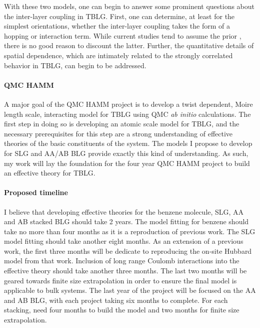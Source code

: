 \documentclass[12pt]{article}
\begin{document}
With these two models, one can begin to answer some prominent questions about the inter-layer coupling in TBLG.
First, one can determine, at least for the simplest orientations, whether the inter-layer coupling takes the form of a hopping or interaction term.
While current studies tend to assume the prior \cite{Fang, Fang2016, PhysRevX.8.031088, PhysRevX.8.031087}, there is no good reason to discount the latter.
Further, the quantitative details of spatial dependence, which are intimately related to the strongly correlated behavior in TBLG, can begin to be addressed.

\vspace{-10pt}
\paragraph{QMC HAMM}
A major goal of the QMC HAMM project is to develop a twist dependent, Moire length scale, interacting model for TBLG using QMC \textit{ab initio} calculations.
The first step in doing so is developing an atomic scale model for TBLG, and the necessary prerequisites for this step are a strong understanding of effective theories of the basic constituents of the system.
The models I propose to develop for SLG and AA/AB BLG provide exactly this kind of understanding.
As such, my work will lay the foundation for the four year QMC HAMM project to build an effective theory for TBLG.

\vspace{-10pt}
\paragraph{Proposed timeline} I believe that developing effective theories for the benzene molecule, SLG, AA and AB stacked BLG should take 2 years. 
The model fitting for benzene should take no more than four months as it is a reproduction of previous work.
The SLG model fitting should take another eight months.
As an extension of a previous work, the first three months will be dedicate to reproducing the on-site Hubbard model from that work.
Inclusion of long range Coulomb interactions into the effective theory should take another three months.
The last two months will be geared towards finite size extrapolation in order to ensure the final model is applicable to bulk systems.
The last year of the project will be focused on the AA and AB BLG, with each project taking six months to complete.
For each stacking, need four months to build the model and two months for finite size extrapolation.


\vspace{-10pt}
\begin{multicols}{2}
\begin{spacing}{0.5}
{\footnotesize


}
\end{spacing}
\end{multicols}
\end{document}
